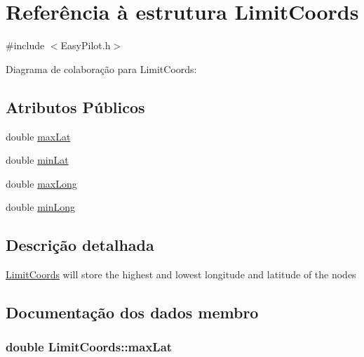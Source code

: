 \hypertarget{struct_limit_coords}{}\section{Referência à estrutura Limit\+Coords}
\label{struct_limit_coords}


{\ttfamily \#include $<$Easy\+Pilot.\+h$>$}



Diagrama de colaboração para Limit\+Coords\+:
\subsection*{Atributos Públicos}
\begin{DoxyCompactItemize}
\item 
double \hyperlink{struct_limit_coords_a9a0fcf9e011923cb568a1c584a51f654}{max\+Lat}
\item 
double \hyperlink{struct_limit_coords_a1a647ec24500cd353ef30d0de159f0be}{min\+Lat}
\item 
double \hyperlink{struct_limit_coords_aeaddaee7845266a6f234ffd50f748ae4}{max\+Long}
\item 
double \hyperlink{struct_limit_coords_a3ef4041cf2ffec8011de8ff137180895}{min\+Long}
\end{DoxyCompactItemize}


\subsection{Descrição detalhada}
\hyperlink{struct_limit_coords}{Limit\+Coords} will store the highest and lowest longitude and latitude of the nodes 

\subsection{Documentação dos dados membro}
\hypertarget{struct_limit_coords_a9a0fcf9e011923cb568a1c584a51f654}{}
\subsubsection[{max\+Lat}]{\setlength{\rightskip}{0pt plus 5cm}double Limit\+Coords\+::max\+Lat}\label{struct_limit_coords_a9a0fcf9e011923cb568a1c584a51f654}
\hypertarget{struct_limit_coords_aeaddaee7845266a6f234ffd50f748ae4}{}
